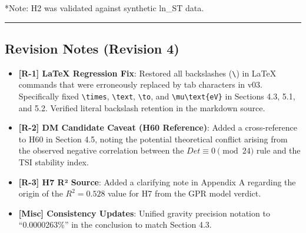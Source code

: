 \documentclass[
]{article}
\providecommand{\tightlist}{%
  \setlength{\itemsep}{0pt}\setlength{\parskip}{0pt}}
\begin{document}
*Note: H2 was validated against synthetic ln\_ST data.

\begin{center}\rule{0.5\linewidth}{0.5pt}\end{center}

\subsection{Revision Notes (Revision
4)}\label{revision-notes-revision-4}

\begin{itemize}
\tightlist
\item
  \textbf{{[}R-1{]} LaTeX Regression Fix}: Restored all backslashes
  (\texttt{\textbackslash{}}) in LaTeX commands that were erroneously
  replaced by tab characters in v03. Specifically fixed
  \texttt{\textbackslash{}times}, \texttt{\textbackslash{}text},
  \texttt{\textbackslash{}to}, and
  \texttt{\textbackslash{}mu\textbackslash{}text\{eV\}} in Sections 4.3,
  5.1, and 5.2. Verified literal backslash retention in the markdown
  source.
\item
  \textbf{{[}R-2{]} DM Candidate Caveat (H60 Reference)}: Added a
  cross-reference to H60 in Section 4.5, noting the potential
  theoretical conflict arising from the observed negative correlation
  between the \(Det \equiv 0 \pmod{24}\) rule and the TSI stability
  index.
\item
  \textbf{{[}R-3{]} H7 R² Source}: Added a clarifying note in Appendix A
  regarding the origin of the \(R^2=0.528\) value for H7 from the GPR
  model verdict.
\item
  \textbf{{[}Misc{]} Consistency Updates}: Unified gravity precision
  notation to ``0.0000263\%'' in the conclusion to match Section 4.3.
\end{itemize}
\end{document}
